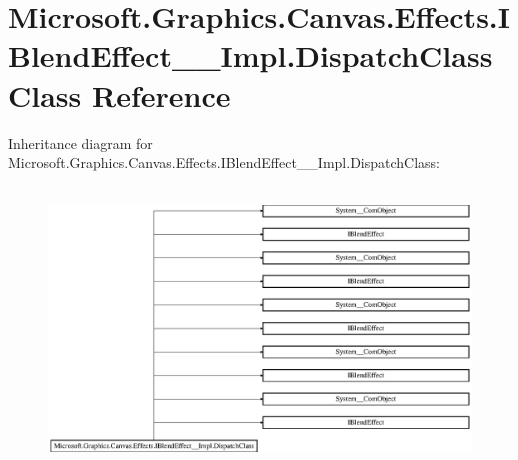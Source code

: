 \hypertarget{class_microsoft_1_1_graphics_1_1_canvas_1_1_effects_1_1_i_blend_effect_____impl_1_1_dispatch_class}{}\section{Microsoft.\+Graphics.\+Canvas.\+Effects.\+I\+Blend\+Effect\+\_\+\+\_\+\+Impl.\+Dispatch\+Class Class Reference}
\label{class_microsoft_1_1_graphics_1_1_canvas_1_1_effects_1_1_i_blend_effect_____impl_1_1_dispatch_class}
Inheritance diagram for Microsoft.\+Graphics.\+Canvas.\+Effects.\+I\+Blend\+Effect\+\_\+\+\_\+\+Impl.\+Dispatch\+Class\+:\begin{figure}[H]
\begin{center}
\leavevmode
\includegraphics[height=7.512195cm]{class_microsoft_1_1_graphics_1_1_canvas_1_1_effects_1_1_i_blend_effect_____impl_1_1_dispatch_class}
\end{center}
\end{figure}
